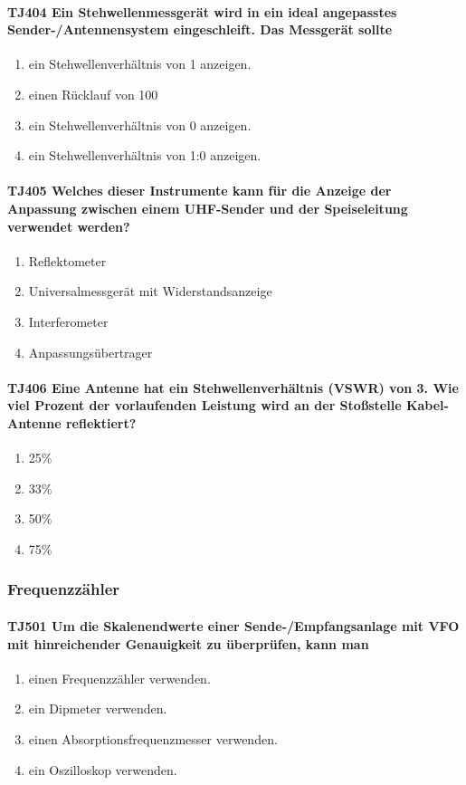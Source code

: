 \documentclass[8pt]{article}
\begin{document}
\paragraph*{TJ404 Ein Stehwellenmessgerät wird in ein ideal angepasstes Sender-/Antennensystem eingeschleift. Das Messgerät sollte} 
\begin{enumerate}[nolistsep,label=\Alph*]
\item ein Stehwellenverhältnis von 1 anzeigen.
\item einen Rücklauf von 100%
\item ein Stehwellenverhältnis von 0 anzeigen.
\item ein Stehwellenverhältnis von 1:0 anzeigen.
\end{enumerate}

\paragraph*{TJ405 Welches dieser Instrumente kann für die Anzeige der Anpassung zwischen einem UHF-Sender und der Speiseleitung verwendet werden?}
\begin{enumerate}[nolistsep,label=\Alph*]
\item Reflektometer
\item Universalmessgerät mit Widerstandsanzeige
\item Interferometer
\item Anpassungsübertrager
\end{enumerate}

\paragraph*{TJ406 Eine Antenne hat ein Stehwellenverhältnis (VSWR) von 3. Wie viel Prozent der vorlaufenden Leistung wird an der Stoßstelle Kabel-Antenne reflektiert?}
\begin{enumerate}[nolistsep,label=\Alph*]
\item 25\%
\item 33\%
\item 50\%
\item 75\%
\end{enumerate}

\pagebreak
\subsubsection{Frequenzzähler}
\paragraph*{TJ501 Um die Skalenendwerte einer Sende-/Empfangsanlage mit VFO mit hinreichender Genauigkeit zu überprüfen, kann man} 
\begin{enumerate}[nolistsep,label=\Alph*]
\item einen Frequenzzähler verwenden.
\item ein Dipmeter verwenden.
\item einen Absorptionsfrequenzmesser verwenden.
\item ein Oszilloskop verwenden.
\end{enumerate}
\end{document}
